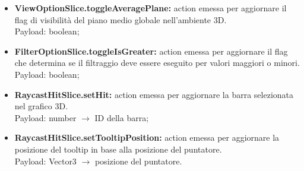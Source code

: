 \begin{itemize}
    \item \textbf{ViewOptionSlice.toggleAveragePlane:} action emessa per aggiornare il flag di visibilità del piano medio globale nell'ambiente 3D. \\ Payload: boolean;
    \item \textbf{FilterOptionSlice.toggleIsGreater:} action emessa per aggiornare il flag che determina se il filtraggio deve essere eseguito per valori maggiori o minori. \\ Payload: boolean;
    \item \textbf{RaycastHitSlice.setHit:} action emessa per aggiornare la barra selezionata nel grafico 3D. \\ Payload: number $\rightarrow$ ID della barra;
    \item \textbf{RaycastHitSlice.setTooltipPosition:} action emessa per aggiornare la posizione del tooltip in base alla posizione del puntatore.\\ Payload: Vector3 $\rightarrow$ posizione del puntatore.
\end{itemize}
